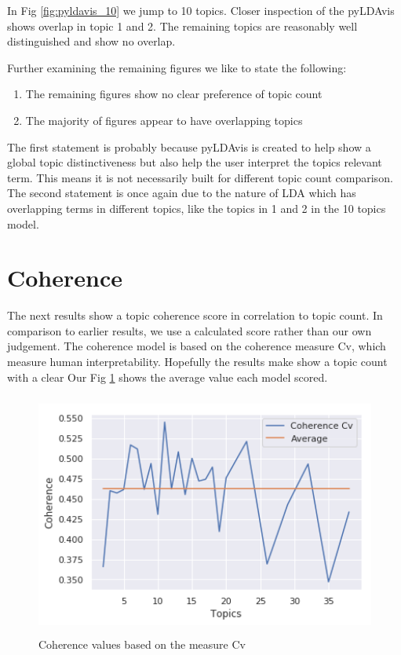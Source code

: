 In Fig \ref{fig:pyldavis_10} we jump to 10 topics. Closer inspection of the pyLDAvis shows overlap in topic 1 and 2. The remaining topics are reasonably well distinguished and show no overlap. 

Further examining the remaining figures we like to state the following:
\begin{enumerate}
  \item The remaining figures show no clear preference of topic count
  \item The majority of figures appear to have overlapping topics
\end{enumerate}
The first statement is probably because pyLDAvis is created to help show a global topic distinctiveness but also help the user interpret the topics relevant term. This means it is not necessarily built for different topic count comparison. The second statement is once again due to the nature of LDA which has overlapping terms in different topics, like the topics in 1 and 2 in the 10 topics model.

\FloatBarrier
\section{Coherence}\label{results:coherence}
The next results show a topic coherence score in correlation to topic count. In comparison to earlier results, we use a calculated score rather than our own judgement. The coherence model is based on the coherence measure Cv, which measure human interpretability. Hopefully the results make show a topic count with a clear  Our Fig \ref{fig:coherence} shows the average value each model scored. 

 \begin{figure}[h]
    \centering
    \includegraphics[width=15cm, height=8cm]{figures/coherence_values_topics.png}
    \caption{Coherence values based on the measure Cv}
    \label{fig:coherence}
\end{figure}

